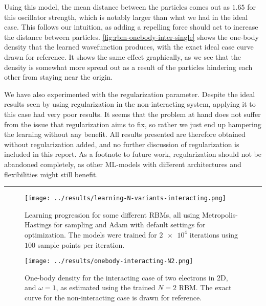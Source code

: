 \documentclass[a4paper, 11pt]{article}
\begin{document}
\begin{multicols}{2}
    Using this model, the mean distance between the particles comes out as
    $1.65$ for this oscillator strength, which is notably larger than what we
    had in the ideal case. This follows our intuition, as adding a repelling
    force should act to increase the distance between particles.
    \autoref{fig:rbm-onebody-inter-single} shows the one-body density that the learned
    wavefunction produces, with the exact ideal case curve drawn for reference.
    It shows the same effect graphically, as we see that the density is somewhat
    more spread out as a result of the particles hindering each other from
    staying near the origin.

    We have also experimented with the regularization parameter. Despite the
    ideal results seen by using regularization in the non-interacting system,
    applying it to this case had very poor results. It seems that the problem at
    hand does not suffer from the issue that regularization aims to fix, so
    rather we just end up hampering the learning without any benefit. All
    results presented are therefore obtained without regularization added, and
    no further discussion of regularization is included in this report. As a
    footnote to future work, regularization should not be abandoned completely,
    as other ML-models with different architectures and flexibilities might
    still benefit.

\end{multicols}
\hrule
\begin{figure}[ht]
    \centering
    \texttt{[image: ../results/learning-N-variants-interacting.png]}
    \caption{Learning progression for some different RBMs, all using
    Metropolis-Hastings for sampling and Adam with default settings for
    optimization. The models were trained for $\num{2e4}$ iterations using $100$
    sample points per iteration.}
    \label{fig:N-variants-messy}
\end{figure}
\begin{figure}[ht]
    \centering
    \texttt{[image: ../results/onebody-interacting-N2.png]}
    \caption{One-body density for the interacting case of two electrons in 2D,
    and $\omega = 1$, as estimated using the trained $N=2$ RBM. The exact curve
    for the non-interacting case is drawn for reference. }
    \label{fig:rbm-onebody-inter-single}
\end{figure}
\end{document}
